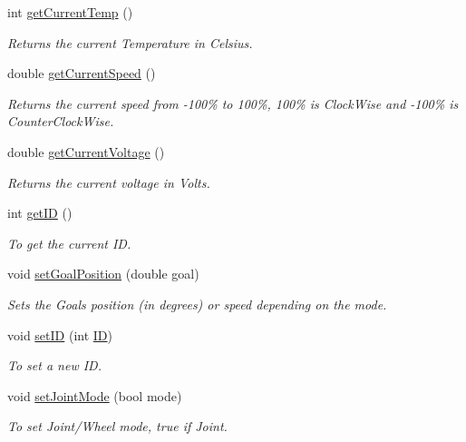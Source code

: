 \begin{DoxyCompactItemize}
int \hyperlink{class_a_x12_ab16fad4c8c034d56acce15fc9102f34d}{get\+Current\+Temp} ()
\begin{DoxyCompactList}\small\item\em Returns the current Temperature in Celsius. \end{DoxyCompactList}\item 
double \hyperlink{class_a_x12_a23c7ed54716c4b144a68d801f324e3ef}{get\+Current\+Speed} ()
\begin{DoxyCompactList}\small\item\em Returns the current speed from -\/100\% to 100\%, 100\% is Clock\+Wise and -\/100\% is Counter\+Clock\+Wise. \end{DoxyCompactList}\item 
double \hyperlink{class_a_x12_a9ef946bfc1ad4dce5fed4101ed321efe}{get\+Current\+Voltage} ()
\begin{DoxyCompactList}\small\item\em Returns the current voltage in Volts. \end{DoxyCompactList}\item 
int \hyperlink{class_a_x12_a745ab1f31fa2cd8c7a5797aeb605cd0b}{get\+I\+D} ()
\begin{DoxyCompactList}\small\item\em To get the current I\+D. \end{DoxyCompactList}\item 
void \hyperlink{class_a_x12_a6b27a3c6314604b499d9fa47d180f5d3}{set\+Goal\+Position} (double goal)
\begin{DoxyCompactList}\small\item\em Sets the Goal\textquotesingle{}s position (in degrees) or speed depending on the mode. \end{DoxyCompactList}\item 
void \hyperlink{class_a_x12_ab9fe5d0e2286985977985de6d84b1103}{set\+I\+D} (int \hyperlink{class_a_x12_a08d272b502d65464202a3aa97825aec0ab2565d5698c9d943a8bcecf02b1389ad}{I\+D})
\begin{DoxyCompactList}\small\item\em To set a new I\+D. \end{DoxyCompactList}\item 
void \hyperlink{class_a_x12_ac48405a5f4aa73c1f2d56f633dfbec50}{set\+Joint\+Mode} (bool mode)
\begin{DoxyCompactList}\small\item\em To set Joint/\+Wheel mode, true if Joint. \end{DoxyCompactList}\item 

\end{DoxyCompactItemize}
